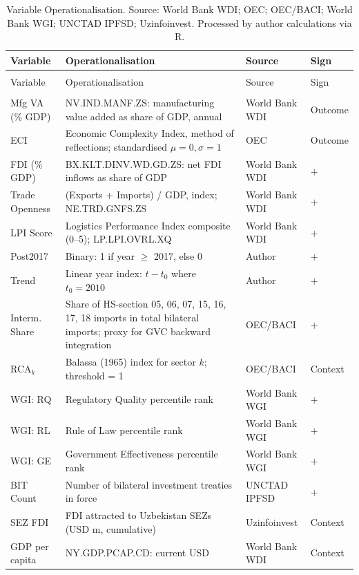 \setlength{\tabcolsep}{4pt}
\begin{longtable}{@{}>{\RaggedRight\arraybackslash}p{2.4cm}>{\RaggedRight\arraybackslash}p{5.3cm}>{\RaggedRight\arraybackslash}p{2.6cm}>{\RaggedRight\arraybackslash}p{1.7cm}@{}}
 \caption{Variable Operationalisation. Source: World Bank WDI; OEC; OEC/BACI; World Bank WGI; UNCTAD IPFSD; Uzinfoinvest. Processed by author calculations via R.}
 \label{tab:variables} \\
 \toprule
 Variable & Operationalisation & Source & Sign \\
 \midrule
 \endfirsthead
 \multicolumn{4}{c}{\small\textit{(continued from previous page)}} \\
 \toprule
 Variable & Operationalisation & Source & Sign \\
 \midrule
 \endhead
 \midrule
 \multicolumn{4}{r}{\small\textit{(continues on next page)}} \\
 \endfoot
 \bottomrule
 \endlastfoot
 Mfg VA (\% GDP) & NV.IND.MANF.ZS: manufacturing value added as share of GDP, annual & World Bank WDI & Outcome \\[4pt]
 ECI & Economic Complexity Index, method of reflections; standardised $\mu=0, \sigma=1$ & OEC & Outcome \\[4pt]
 FDI (\% GDP) & BX.KLT.DINV.WD.GD.ZS: net FDI inflows as share of GDP & World Bank WDI & $+$ \\[4pt]
 Trade Openness & (Exports + Imports) / GDP, index; NE.TRD.GNFS.ZS & World Bank WDI & $+$ \\[4pt]
 LPI Score & Logistics Performance Index composite (0--5); LP.LPI.OVRL.XQ & World Bank WDI & $+$ \\[4pt]
 Post2017 & Binary: 1 if year $\geq$ 2017, else 0 & Author & $+$ \\[4pt]
 Trend & Linear year index: $t - t_0$ where $t_0 = 2010$ & Author & $+$ \\[4pt]
 Interm. Share & Share of HS-section 05, 06, 07, 15, 16, 17, 18 imports in total bilateral imports; proxy for GVC backward integration & OEC/BACI & $+$ \\[4pt]
 RCA$_k$ & Balassa (1965) index for sector $k$; threshold = 1 & OEC/BACI & Context \\[4pt]
 WGI: RQ & Regulatory Quality percentile rank & World Bank WGI & $+$ \\[4pt]
 WGI: RL & Rule of Law percentile rank & World Bank WGI & $+$ \\[4pt]
 WGI: GE & Government Effectiveness percentile rank & World Bank WGI & $+$ \\[4pt]
 BIT Count & Number of bilateral investment treaties in force & UNCTAD IPFSD & $+$ \\[4pt]
 SEZ FDI & FDI attracted to Uzbekistan SEZs (USD m, cumulative) & Uzinfoinvest & Context \\[4pt]
 GDP per capita & NY.GDP.PCAP.CD: current USD & World Bank WDI & Context \\[4pt]
\end{longtable}

